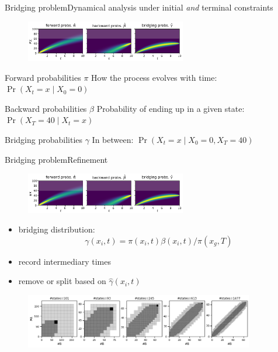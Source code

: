\documentclass[9pt]{beamer}
\newcommand{\bottomcite}[1]{\vspace*{\fill} {\scriptsize \parencite{#1}}}
\begin{document}
\begin{frame}{Bridging problem}{Dynamical analysis under initial \emph{and} terminal constraints}
    \begin{figure}
        \includegraphics[width=7cm]{../gfx/bridging_bd.pdf}
    \end{figure}
    \begin{block}{Forward probabilities $\pi$}
        How the process evolves with time: $\Pr({X_t=x\mid X_0=0})$
    \end{block}
    \begin{block}{Backward probabilities $\beta$}
        Probability of ending up in a given state: $\Pr(X_T=40 \mid X_t = x)$
    \end{block}
    \begin{block}{Bridging probabilities $\gamma$}
        In between: $\Pr (X_t=x\mid X_0=0, X_T=40)$
    \end{block}
    \bottomcite{backenkohler2020analysis}
\end{frame}

\begin{frame}{Bridging problem}{Refinement}
    \begin{figure}
        \includegraphics[width=7cm]{../gfx/bridging_bd.pdf}
    \end{figure}
    \begin{itemize}
        \item bridging distribution: 
            \[ 
            \gamma(x_i, t) = \pi(x_i, t)\beta(x_i, t)/\pi(x_g, T) \]
        \item record intermediary times
        \item remove or split based on $\hat{\gamma}(x_i, t)$
    \end{itemize}
    \begin{figure}
        \includegraphics[width=10cm]{../gfx/refinement.png}
    \end{figure}

    \bottomcite{backenkohler2020analysis}
\end{frame}
\end{document}
